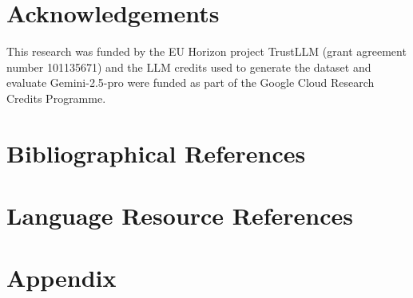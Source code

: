 \documentclass[10pt, a4paper]{article}
\begin{document}
\section*{Acknowledgements}
\label{sec:acknowledgements}

This research was funded by the EU Horizon project TrustLLM (grant agreement number
101135671) and the LLM credits used to generate the dataset and evaluate Gemini-2.5-pro
were funded as part of the Google Cloud Research Credits Programme.


\newpage
\nocite{*}
\section{Bibliographical References}\label{sec:reference}




\section{Language Resource References}
\label{lr:ref}

\newpage
\onecolumn
\appendix

\section{Appendix}
\end{document}
